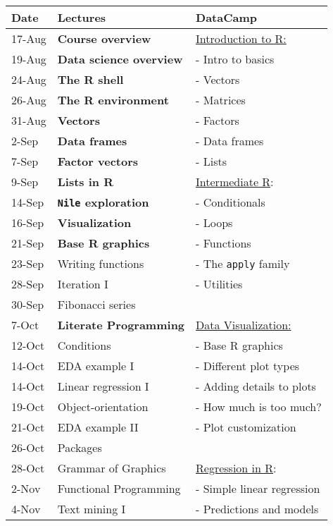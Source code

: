 \documentclass[11pt]{article}
\begin{document}
\begin{center}
\begin{tabular}{lll}
\textbf{Date} & \textbf{Lectures} & \textbf{DataCamp}\\
\hline
17-Aug & \textbf{Course overview} & \href{https://learn.datacamp.com/courses/free-introduction-to-r}{Introduction to R:}\\
19-Aug & \textbf{Data science overview} & - Intro to basics\\
24-Aug & \textbf{The R shell} & - Vectors\\
26-Aug & \textbf{The R environment} & - Matrices\\
31-Aug & \textbf{Vectors} & - Factors\\
2-Sep & \textbf{Data frames} & - Data frames\\
7-Sep & \textbf{Factor vectors} & - Lists\\
9-Sep & \textbf{Lists in R} & \href{https://learn.datacamp.com/courses/intermediate-r}{Intermediate R}:\\
14-Sep & \textbf{\texttt{Nile} exploration} & - Conditionals\\
16-Sep & \textbf{Visualization} & - Loops\\
21-Sep & \textbf{Base R graphics} & - Functions\\
23-Sep & Writing functions & - The \texttt{apply} family\\
28-Sep & Iteration I & - Utilities\\
30-Sep & Fibonacci series & \\
7-Oct & \textbf{Literate Programming} & \href{https://learn.datacamp.com/courses/data-visualization-in-r}{Data Visualization:}\\
12-Oct & Conditions & - Base R graphics\\
14-Oct & EDA example I & - Different plot types\\
14-Oct & Linear regression I & - Adding details to plots\\
19-Oct & Object-orientation & - How much is too much?\\
21-Oct & EDA example II & - Plot customization\\
26-Oct & Packages & \\
28-Oct & Grammar of Graphics & \href{https://learn.datacamp.com/courses/introduction-to-regression-in-r}{Regression in R}:\\
2-Nov & Functional Programming & - Simple linear regression\\
4-Nov & Text mining I & - Predictions and models\\

\end{tabular}
\end{center}
\end{document}
